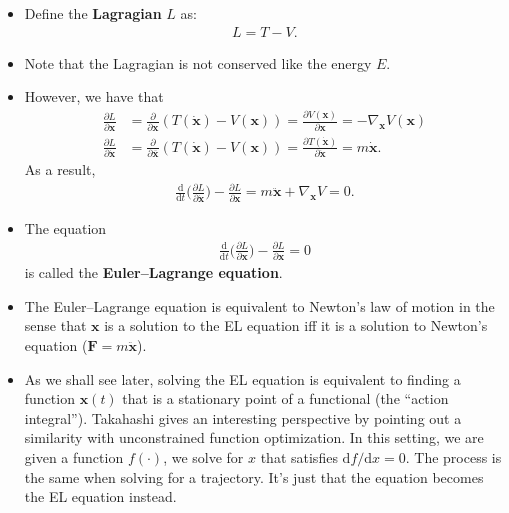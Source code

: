 \documentclass[10pt]{article}
\newcommand{\dee}{\mathrm{d}}
\newcommand{\ve}[1]{\mathbf{#1}}
\begin{document}
  \begin{itemize}
  	\item Define the {\bf Lagragian} $L$ as:
  	\begin{align*}
  		L = T - V.
  	\end{align*}

  	\item Note that the Lagragian is not conserved like the energy $E$.

  	\item However, we have that
  	\begin{align*}
  		\frac{\partial L}{\partial \ve{x}} 
  		&= \frac{\partial }{\partial \ve{x}} (T(\dot{\ve{x}}) - V(\ve{x}))
  		= \frac{\partial V(\ve{x})}{\partial \ve{x}}
  		= - \nabla_{\ve{x}} V(\ve{x}) \\
  		\frac{\partial L}{\partial \dot{\ve{x}}}
  		&= \frac{\partial }{\partial \overline{\ve{x}}} (T(\dot{\ve{x}}) - V(\ve{x}))
  		= \frac{\partial T(\dot{\ve{x}})}{\partial \dot{\ve{x}}}
  		= m\dot{\ve{x}}.
  	\end{align*}
  	As a result,
  	\begin{align*}
  		\frac{\dee}{\dee t}\bigg( \frac{\partial L}{\partial \dot{\ve{x}}} \bigg) 
  		- \frac{\partial L}{\partial \ve{x}}
  		= m\ddot{\ve{x}} + \nabla_{\ve{x}} V = 0.
  	\end{align*}

  	\item The equation
  	\begin{align*}
  		\frac{\dee}{\dee t}\bigg( \frac{\partial L}{\partial \ve{x}} \bigg) - \frac{\partial L}{\partial \ve{x}} = 0
  	\end{align*}
  	is called the {\bf Euler--Lagrange equation}.

  	\item The Euler--Lagrange equation is equivalent to Newton's law of motion in the sense that $\ve{x}$ is a solution to the EL equation iff it is a solution to Newton's equation ($\ve{F} = m\ddot{\ve{x}}$).

  	\item As we shall see later, solving the EL equation is equivalent to finding a function $\ve{x}(t)$ that is a stationary point of a functional (the ``action integral''). Takahashi gives an interesting perspective by pointing out a similarity with unconstrained function optimization. In this setting, we are given a function $f(\cdot)$, we solve for $x$ that satisfies $\dee f / \dee x = 0$. The process is the same when solving for a trajectory. It's just that the equation becomes the EL equation instead.
  \end{itemize}
\end{document}
